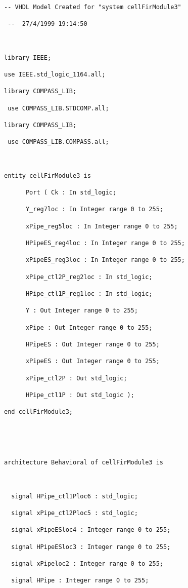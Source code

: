 \begin{verbatim}

-- VHDL Model Created for "system cellFirModule3" 

 --  27/4/1999 19:14:50



library IEEE;

use IEEE.std_logic_1164.all;

library COMPASS_LIB;

 use COMPASS_LIB.STDCOMP.all;

library COMPASS_LIB; 

 use COMPASS_LIB.COMPASS.all;

  

entity cellFirModule3 is

      Port ( Ck : In std_logic;

      Y_reg7loc : In Integer range 0 to 255;

      xPipe_reg5loc : In Integer range 0 to 255;

      HPipeES_reg4loc : In Integer range 0 to 255;

      xPipeES_reg3loc : In Integer range 0 to 255;

      xPipe_ctl2P_reg2loc : In std_logic;

      HPipe_ctl1P_reg1loc : In std_logic;

      Y : Out Integer range 0 to 255;

      xPipe : Out Integer range 0 to 255;

      HPipeES : Out Integer range 0 to 255;

      xPipeES : Out Integer range 0 to 255;

      xPipe_ctl2P : Out std_logic;

      HPipe_ctl1P : Out std_logic );

end cellFirModule3;





architecture Behavioral of cellFirModule3 is



  signal HPipe_ctl1Ploc6 : std_logic;

  signal xPipe_ctl2Ploc5 : std_logic;

  signal xPipeESloc4 : Integer range 0 to 255;

  signal HPipeESloc3 : Integer range 0 to 255;

  signal xPipeloc2 : Integer range 0 to 255;

  signal HPipe : Integer range 0 to 255;


\end{verbatim}

